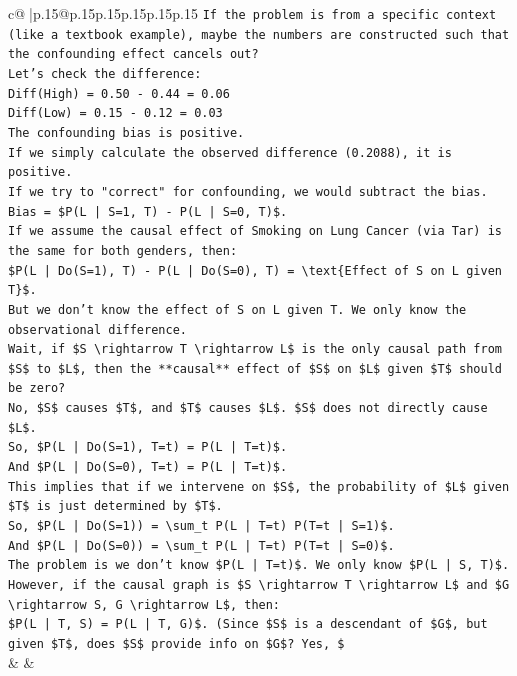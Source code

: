 \documentclass{article}
\begin{document}
{\begin{supertabular}{c@{$\;$}|p{.15\linewidth}@{}p{.15\linewidth}p{.15\linewidth}p{.15\linewidth}p{.15\linewidth}p{.15\linewidth}}
{{{\texttt{If the problem is from a specific context (like a textbook example), maybe the numbers are constructed such that the confounding effect cancels out?} \\
\texttt{Let's check the difference:} \\
\texttt{Diff(High) = 0.50 {-} 0.44 = 0.06} \\
\texttt{Diff(Low) = 0.15 {-} 0.12 = 0.03} \\
\texttt{The confounding bias is positive.} \\
\texttt{If we simply calculate the observed difference (0.2088), it is positive.} \\
\texttt{If we try to "correct" for confounding, we would subtract the bias.} \\
\texttt{Bias = \$P(L | S=1, T) {-} P(L | S=0, T)\$.} \\
\texttt{If we assume the causal effect of Smoking on Lung Cancer (via Tar) is the same for both genders, then:} \\
\texttt{\$P(L | Do(S=1), T) {-} P(L | Do(S=0), T) = \textbackslash{}text\{Effect of S on L given T\}\$.} \\
\texttt{But we don't know the effect of S on L given T. We only know the observational difference.} \\
\texttt{Wait, if \$S \textbackslash{}rightarrow T \textbackslash{}rightarrow L\$ is the only causal path from \$S\$ to \$L\$, then the **causal** effect of \$S\$ on \$L\$ given \$T\$ should be zero?} \\
\texttt{No, \$S\$ causes \$T\$, and \$T\$ causes \$L\$. \$S\$ does not directly cause \$L\$.} \\
\texttt{So, \$P(L | Do(S=1), T=t) = P(L | T=t)\$.} \\
\texttt{And \$P(L | Do(S=0), T=t) = P(L | T=t)\$.} \\
\texttt{This implies that if we intervene on \$S\$, the probability of \$L\$ given \$T\$ is just determined by \$T\$.} \\
\texttt{So, \$P(L | Do(S=1)) = \textbackslash{}sum\_t P(L | T=t) P(T=t | S=1)\$.} \\
\texttt{And \$P(L | Do(S=0)) = \textbackslash{}sum\_t P(L | T=t) P(T=t | S=0)\$.} \\
\texttt{The problem is we don't know \$P(L | T=t)\$. We only know \$P(L | S, T)\$.} \\
\texttt{However, if the causal graph is \$S \textbackslash{}rightarrow T \textbackslash{}rightarrow L\$ and \$G \textbackslash{}rightarrow S, G \textbackslash{}rightarrow L\$, then:} \\
\texttt{\$P(L | T, S) = P(L | T, G)\$. (Since \$S\$ is a descendant of \$G\$, but given \$T\$, does \$S\$ provide info on \$G\$? Yes, \$} \\
            }
        }
    }
    & & \\ \\


\end{supertabular}}
\end{document}

